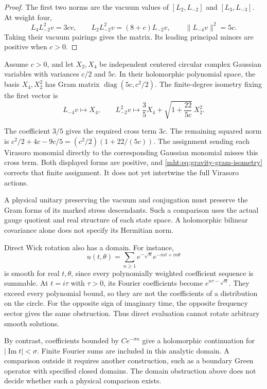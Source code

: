 \begin{proof}
The first two norms are the vacuum values of
$[L_2,L_{-2}]$ and $[L_3,L_{-3}]$.
At weight four,
\[
 L_4L_{-2}^2v=3cv,
 \qquad L_2L_{-2}^2v=(8+c)L_{-2}v,
 \qquad \|L_{-4}v\|^2=5c.
\]
Taking their vacuum pairings gives the matrix.
Its leading principal minors are positive when $c>0$.
\end{proof}

Assume $c>0$, and let $X_2,X_4$ be independent centered circular complex Gaussian
variables with variances $c/2$ and $5c$.
In their holomorphic polynomial space, the basis $X_4,X_2^2$
has Gram matrix $\operatorname{diag}(5c,c^2/2)$.
The finite-degree isometry fixing the first vector is
\begin{equation}\label{mht:eq:gravity-gram-isometry}
 L_{-4}v\longmapsto X_4,
 \qquad
 L_{-2}^2v\longmapsto
     \frac35X_4+\sqrt{1+\frac{22}{5c}}\,X_2^2.
\end{equation}

The coefficient $3/5$ gives the required cross term $3c$.
The remaining squared norm is
$c^2/2+4c-9c/5=(c^2/2)(1+22/(5c))$.
The assignment sending each Virasoro monomial directly to the
corresponding Gaussian monomial misses this cross term.
Both displayed forms are positive, and
\eqref{mht:eq:gravity-gram-isometry} corrects that finite assignment.
It does not yet intertwine the full Virasoro actions.

A physical unitary preserving the vacuum and conjugation must
preserve the Gram forms of its marked stress descendants.
Such a comparison uses the actual gauge quotient and real
structure of each state space. A holomorphic bilinear covariance
alone does not specify its Hermitian norm.

Direct Wick rotation also has a domain.
For instance,
\[
 u(t,\theta)=\sum_{n\ge1}e^{-\sqrt n}e^{-int+in\theta}
\]
is smooth for real $t,\theta$, since every polynomially weighted
coefficient sequence is summable.
At $t=i\tau$ with $\tau>0$, its Fourier coefficients become
$e^{n\tau-\sqrt n}$.
They exceed every polynomial bound, so they are not the
coefficients of a distribution on the circle.
For the opposite sign of imaginary time, the opposite frequency
sector gives the same obstruction.
Thus direct evaluation cannot rotate arbitrary smooth solutions.

By contrast, coefficients bounded by $Ce^{-\sigma n}$ give a
holomorphic continuation for $|\operatorname{Im}t|<\sigma$.
Finite Fourier sums are included in this analytic domain.
A comparison outside it requires another construction, such as
a boundary Green operator with specified closed domains.
The domain obstruction above does not decide whether such a
physical comparison exists.

